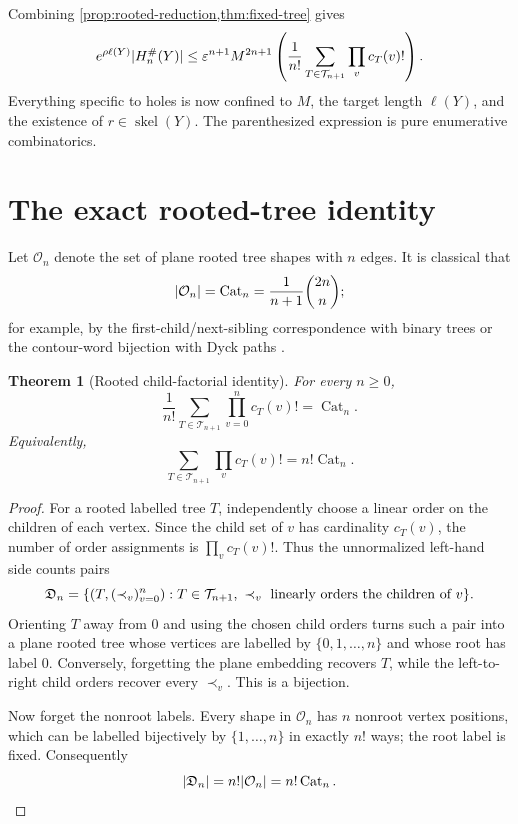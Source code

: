 \documentclass[11pt,a4paper]{article}
\newtheorem{theorem}{Theorem}[section]
\theoremstyle{definition}
\newcommand{\skel}{\operatorname{skel}}
\newcommand{\Cat}{\operatorname{Cat}}
\newcommand{\Tree}{\mathcal T}
\newcommand{\Plane}{\mathcal O}
\newcommand{\eps}{\varepsilon}
\newcommand{\Hsharp}{H^{\#}}
\DeclarePairedDelimiter{\abs}{\lvert}{\rvert}
\DeclarePairedDelimiter{\set}{\lbrace}{\rbrace}
\begin{document}
Combining \cref{prop:rooted-reduction,thm:fixed-tree} gives
\begin{equation}
 e^{\rho\ell(Y)}\abs{\Hsharp_n(Y)}
 \le \eps^{n+1}M^{2n+1}
    \left(\frac1{n!}\sum_{T\in\Tree_{n+1}}\prod_v c_T(v)!\right).
 \label{eq:before-catalan}
\end{equation}
Everything specific to holes is now confined to $M$, the target length $\ell(Y)$, and
the existence of $r\in\skel(Y)$.  The parenthesized expression is pure enumerative
combinatorics.

\section{The exact rooted-tree identity}
\label{sec:catalan-identity}

Let $\Plane_n$ denote the set of plane rooted tree shapes with $n$ edges.  It is
classical that
\begin{equation}
  \abs{\Plane_n}=\Cat_n=\frac{1}{n+1}\binom{2n}{n};
  \label{eq:catalan-count}
\end{equation}
for example, by the first-child/next-sibling correspondence with binary trees or the
contour-word bijection with Dyck paths \cite{Stanley1999,FlajoletSedgewick2009}.

\begin{theorem}[Rooted child-factorial identity]
\label{thm:tree-catalan}
For every $n\ge0$,
\begin{equation}
  \boxed{
  \frac1{n!}\sum_{T\in\Tree_{n+1}}\prod_{v=0}^{n}c_T(v)! = \Cat_n.}
  \label{eq:tree-catalan}
\end{equation}
Equivalently,
\[
  \sum_{T\in\Tree_{n+1}}\prod_v c_T(v)! = n!\Cat_n.
\]
\end{theorem}

\begin{proof}
For a rooted labelled tree $T$, independently choose a linear order on the children of
each vertex.  Since the child set of $v$ has cardinality $c_T(v)$, the number of order
assignments is $\prod_v c_T(v)!$.  Thus the unnormalized left-hand side counts pairs
\[
 \mathfrak D_n=
 \set{(T,(\prec_v)_{v=0}^{n}):
       T\in\Tree_{n+1},\ \prec_v\text{ linearly orders the children of }v}.
\]
Orienting $T$ away from $0$ and using the chosen child orders turns such a pair into a
plane rooted tree whose vertices are labelled by $\{0,1,\ldots,n\}$ and whose root has
label $0$.  Conversely, forgetting the plane embedding recovers $T$, while the
left-to-right child orders recover every $\prec_v$.  This is a bijection.

Now forget the nonroot labels.  Every shape in $\Plane_n$ has $n$ nonroot vertex
positions, which can be labelled bijectively by $\{1,\ldots,n\}$ in exactly $n!$ ways;
the root label is fixed.  Consequently
\[
  \abs{\mathfrak D_n}=n!\abs{\Plane_n}=n!\Cat_n.
\]
\end{proof}
\end{document}
